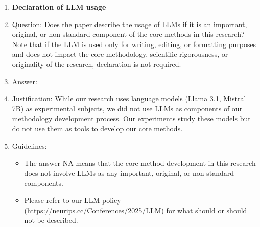 \documentclass{article}
\begin{document}
\begin{enumerate}
\item {\bf Declaration of LLM usage}
    \item[] Question: Does the paper describe the usage of LLMs if it is an important, original, or non-standard component of the core methods in this research? Note that if the LLM is used only for writing, editing, or formatting purposes and does not impact the core methodology, scientific rigorousness, or originality of the research, declaration is not required.
    \item[] Answer: \answerNA{} %
    \item[] Justification: While our research uses language models (Llama 3.1, Mistral 7B) as experimental subjects, we did not use LLMs as components of our methodology development process. Our experiments study these models but do not use them as tools to develop our core methods. 
    \item[] Guidelines:
    \begin{itemize}
        \item The answer NA means that the core method development in this research does not involve LLMs as any important, original, or non-standard components.
        \item Please refer to our LLM policy (\url{https://neurips.cc/Conferences/2025/LLM}) for what should or should not be described.
    \end{itemize}

\end{enumerate}

\end{document}

